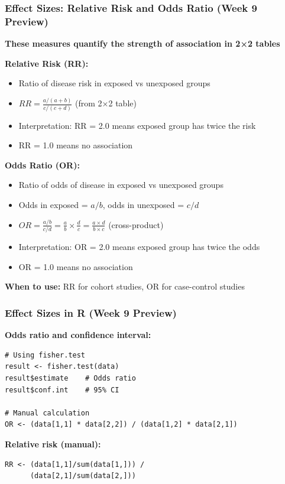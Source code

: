\documentclass{beamer}
\begin{document}
\begin{frame}
\frametitle{Effect Sizes: Relative Risk and Odds Ratio (Week 9 Preview)}
\textbf{These measures quantify the strength of association in 2×2 tables}

\vspace{0.3cm}
\textbf{Relative Risk (RR):}
\begin{itemize}
\item Ratio of disease risk in exposed vs unexposed groups
\item $RR = \frac{a/(a+b)}{c/(c+d)}$ (from 2×2 table)
\item Interpretation: RR = 2.0 means exposed group has twice the risk
\item RR = 1.0 means no association
\end{itemize}

\vspace{0.3cm}
\textbf{Odds Ratio (OR):}
\begin{itemize}
\item Ratio of odds of disease in exposed vs unexposed groups
\item Odds in exposed = $a/b$, odds in unexposed = $c/d$
\item $OR = \frac{a/b}{c/d} = \frac{a}{b} \times \frac{d}{c} = \frac{a \times d}{b \times c}$ (cross-product)
\item Interpretation: OR = 2.0 means exposed group has twice the odds
\item OR = 1.0 means no association
\end{itemize}

\vspace{0.3cm}
\textbf{When to use:} RR for cohort studies, OR for case-control studies
\end{frame}

\begin{frame}[fragile]
\frametitle{Effect Sizes in R (Week 9 Preview)}
\textbf{Odds ratio and confidence interval:}
\begin{verbatim}
# Using fisher.test
result <- fisher.test(data)
result$estimate    # Odds ratio
result$conf.int    # 95% CI

# Manual calculation
OR <- (data[1,1] * data[2,2]) / (data[1,2] * data[2,1])
\end{verbatim}

\vspace{0.5cm}
\textbf{Relative risk (manual):}
\begin{verbatim}
RR <- (data[1,1]/sum(data[1,])) /
      (data[2,1]/sum(data[2,]))
\end{verbatim}
\end{frame}
\end{document}

